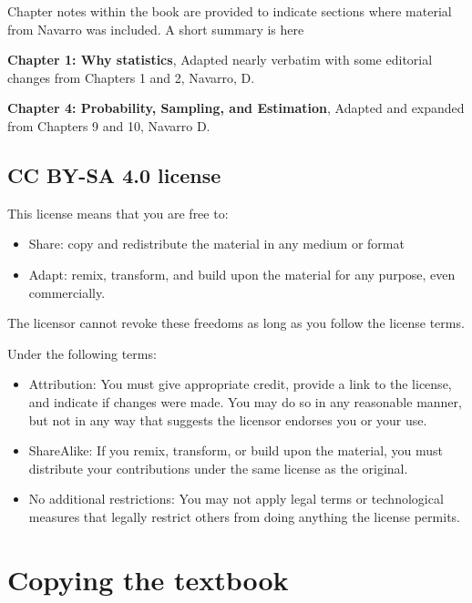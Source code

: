 \documentclass[]{book}
\providecommand{\tightlist}{%
  \setlength{\itemsep}{0pt}\setlength{\parskip}{0pt}}
\begin{document}
Chapter notes within the book are provided to indicate sections where material from Navarro was included. A short summary is here

\textbf{Chapter 1: Why statistics}, Adapted nearly verbatim with some editorial changes from Chapters 1 and 2, Navarro, D.

\textbf{Chapter 4: Probability, Sampling, and Estimation}, Adapted and expanded from Chapters 9 and 10, Navarro D.

\hypertarget{cc-by-sa-4.0-license}{%
\subsection{CC BY-SA 4.0 license}\label{cc-by-sa-4.0-license}}

This license means that you are free to:

\begin{itemize}
\tightlist
\item
  Share: copy and redistribute the material in any medium or format
\item
  Adapt: remix, transform, and build upon the material for any purpose, even commercially.
\end{itemize}

The licensor cannot revoke these freedoms as long as you follow the license terms.

Under the following terms:

\begin{itemize}
\tightlist
\item
  Attribution: You must give appropriate credit, provide a link to the license, and indicate if changes were made. You may do so in any reasonable manner, but not in any way that suggests the licensor endorses you or your use.
\item
  ShareAlike: If you remix, transform, or build upon the material, you must distribute your contributions under the same license as the original.
\item
  No additional restrictions: You may not apply legal terms or technological measures that legally restrict others from doing anything the license permits.
\end{itemize}

\hypertarget{copying-the-textbook}{%
\section{Copying the textbook}\label{copying-the-textbook}}
\end{document}
